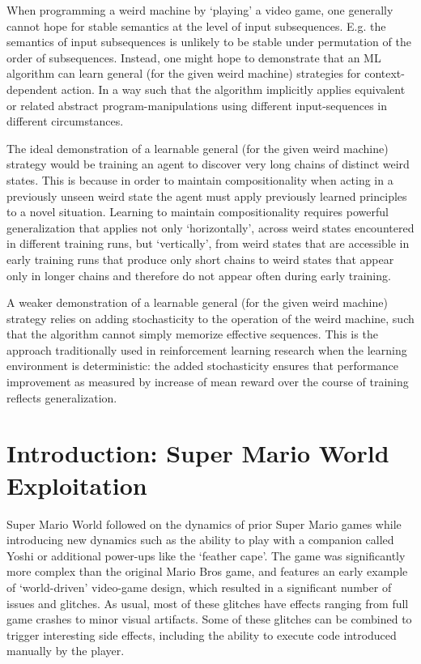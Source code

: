\documentclass[]{article}
\begin{document}
When programming a weird machine by `playing' a video game, one
generally cannot hope for stable semantics at the level of input
subsequences. E.g. the semantics of input subsequences is unlikely to be
stable under permutation of the order of subsequences. Instead, one
might hope to demonstrate that an ML algorithm can learn general (for
the given weird machine) strategies for context-dependent action. In a
way such that the algorithm implicitly applies equivalent or related
abstract program-manipulations using different input-sequences in
different circumstances.

The ideal demonstration of a learnable general (for the given weird
machine) strategy would be training an agent to discover very long
chains of distinct weird states. This is because in order to maintain
compositionality when acting in a previously unseen weird state the
agent must apply previously learned principles to a novel situation.
Learning to maintain compositionality requires powerful generalization
that applies not only `horizontally', across weird states encountered in
different training runs, but `vertically', from weird states that are
accessible in early training runs that produce only short chains to
weird states that appear only in longer chains and therefore do not
appear often during early training.

A weaker demonstration of a learnable general (for the given weird
machine) strategy relies on adding stochasticity to the operation of the
weird machine, such that the algorithm cannot simply memorize effective
sequences. This is the approach traditionally used in reinforcement
learning research when the learning environment is deterministic: the
added stochasticity ensures that performance improvement as measured by
increase of mean reward over the course of training reflects
generalization.

\hypertarget{introduction-super-mario-world-exploitation}{%
\section{Introduction: Super Mario World
Exploitation}\label{introduction-super-mario-world-exploitation}}

Super Mario World followed on the dynamics of prior Super Mario games
while introducing new dynamics such as the ability to play with a
companion called Yoshi or additional power-ups like the `feather cape'.
The game was significantly more complex than the original Mario Bros
game, and features an early example of `world-driven' video-game design,
which resulted in a significant number of issues and glitches. As usual,
most of these glitches have effects ranging from full game crashes to
minor visual artifacts. Some of these glitches can be combined to
trigger interesting side effects, including the ability to execute code
introduced manually by the player.
\end{document}
